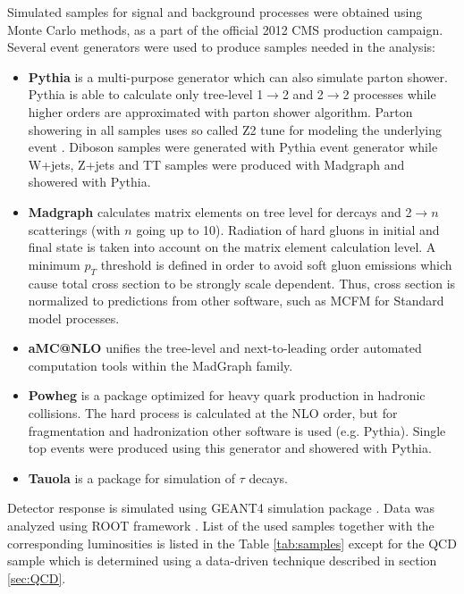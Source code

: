 \par Simulated samples for signal and background processes were obtained using Monte Carlo methods, as a part of the official 2012 CMS production campaign. Several event generators were used to produce samples needed in the analysis:
\begin{itemize}
\item \textbf{Pythia} \cite{Sjostrand:2006za,Sjostrand:2007gs} is a multi-purpose generator which can also simulate parton shower. Pythia is able to calculate only tree-level 1$\rightarrow$2 and 2$\rightarrow$2 processes while higher orders are approximated with parton shower algorithm. Parton showering in all samples uses so called Z2 tune for modeling the underlying event \cite{Field:2010bc,Chatrchyan:2013ala}. Diboson samples were generated with Pythia event generator while W+jets, Z+jets and TT samples were produced with Madgraph and showered with Pythia.  
\item \textbf{Madgraph} \cite{Alwall:2011uj} calculates matrix elements on tree level for dercays and 2$\rightarrow n$ scatterings (with $n$ going up to 10). Radiation of hard gluons in initial and final state is taken into account on the matrix element calculation level. A minimum $p_T$ threshold is defined in order to avoid soft gluon emissions which cause total cross section to be strongly scale dependent. Thus, cross section is normalized to predictions from other software, such as MCFM\cite{Campbell:2010ff} for Standard model processes.   
\item \textbf{aMC@NLO} \cite{Alwall:2014hca} unifies the tree-level and next-to-leading order automated computation tools within the MadGraph family.
\item \textbf{Powheg} \cite{Oleari:2010nx} is a package optimized for heavy quark production in hadronic collisions. The hard process is calculated at the NLO order, but for fragmentation and hadronization other software is used (e.g. Pythia). Single top events were produced using this generator and showered with Pythia. 
\item \textbf{Tauola} \cite{Jadach:1993hs} is a package for simulation of $\tau$ decays.
\end{itemize}
        
Detector response is simulated using GEANT4 simulation package \cite{Agostinelli:2002hh}. Data was analyzed using ROOT framework \cite{Brun:1997pa}. List of the used samples together with the corresponding luminosities is listed in the Table \ref{tab:samples} except for the QCD sample which is determined using a data-driven technique described in section \ref{sec:QCD}.

